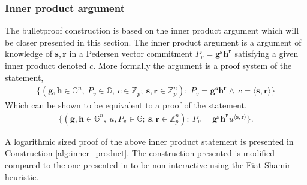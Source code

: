 \subsubsection*{Inner product argument}
\label{sec:inner_prod}
The bulletproof construction is based on the inner product argument which will be closer presented in this section. The inner product argument is a argument of knowledge of $\textbf{s},\mathbf{r}$ in a  Pedersen vector commitment $P_v=\mathbf{g}^\mathbf{s}\mathbf{h}^\mathbf{r}$ satisfying a given inner product denoted $c$. 
More formally the argument is a proof system of the statement,
\begin{align*}
    \{(\mathbf{g},\mathbf{h}\in\mathds{G}^n,\:P_v\in\mathds{G},\:c\in\mathds{Z}_p;\: \mathbf{s},\mathbf{r}\in\mathds{Z}_p^n) : \: P_v=\mathbf{g}^\mathbf{s}\mathbf{h}^\mathbf{r}\wedge\: c =\langle\mathbf{s},\mathbf{r}\rangle\}
\end{align*}
Which can be shown to be equivalent to a proof of the statement,
\begin{align*}
    \{(\mathbf{g},\mathbf{h}\in\mathds{G}^n,\: u,P_v\in\mathds{G};\: \mathbf{s},\mathbf{r}\in\mathds{Z}_p^n) : \: P_v=\mathbf{g}^\mathbf{s}\mathbf{h}^\mathbf{r}u^{\langle\mathbf{s},\mathbf{r}\rangle}\}.
\end{align*}

A logarithmic sized proof of the above inner product statement is presented in Construction \ref{alg:inner_product}. The construction presented is modified compared to the one presented in \cite{bulletProofs_theory} to be non-interactive using the Fiat-Shamir heuristic.

